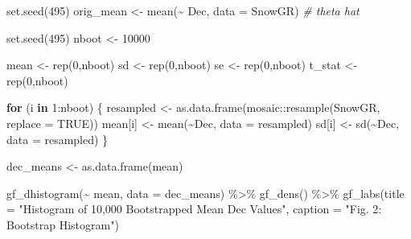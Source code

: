 \documentclass[12pt]{article}
\newenvironment{Shaded}{\begin{snugshade}}{\end{snugshade}}
\newcommand{\AttributeTok}[1]{\textcolor[rgb]{0.77,0.63,0.00}{#1}}
\newcommand{\CommentTok}[1]{\textcolor[rgb]{0.56,0.35,0.01}{\textit{#1}}}
\newcommand{\ConstantTok}[1]{\textcolor[rgb]{0.00,0.00,0.00}{#1}}
\newcommand{\ControlFlowTok}[1]{\textcolor[rgb]{0.13,0.29,0.53}{\textbf{#1}}}
\newcommand{\DecValTok}[1]{\textcolor[rgb]{0.00,0.00,0.81}{#1}}
\newcommand{\FunctionTok}[1]{\textcolor[rgb]{0.00,0.00,0.00}{#1}}
\newcommand{\NormalTok}[1]{#1}
\newcommand{\OtherTok}[1]{\textcolor[rgb]{0.56,0.35,0.01}{#1}}
\newcommand{\SpecialCharTok}[1]{\textcolor[rgb]{0.00,0.00,0.00}{#1}}
\newcommand{\StringTok}[1]{\textcolor[rgb]{0.31,0.60,0.02}{#1}}
\begin{document}
\begin{Shaded}
\begin{Highlighting}[]
\FunctionTok{set.seed}\NormalTok{(}\DecValTok{495}\NormalTok{)}
\NormalTok{orig\_mean }\OtherTok{\textless{}{-}} \FunctionTok{mean}\NormalTok{(}\SpecialCharTok{\textasciitilde{}}\NormalTok{ Dec, }\AttributeTok{data =}\NormalTok{ SnowGR) }\CommentTok{\# theta hat}

\FunctionTok{set.seed}\NormalTok{(}\DecValTok{495}\NormalTok{)}
\NormalTok{nboot }\OtherTok{\textless{}{-}} \DecValTok{10000}

\NormalTok{mean }\OtherTok{\textless{}{-}} \FunctionTok{rep}\NormalTok{(}\DecValTok{0}\NormalTok{,nboot)}
\NormalTok{sd }\OtherTok{\textless{}{-}} \FunctionTok{rep}\NormalTok{(}\DecValTok{0}\NormalTok{,nboot)}
\NormalTok{se }\OtherTok{\textless{}{-}} \FunctionTok{rep}\NormalTok{(}\DecValTok{0}\NormalTok{,nboot)}
\NormalTok{t\_stat }\OtherTok{\textless{}{-}} \FunctionTok{rep}\NormalTok{(}\DecValTok{0}\NormalTok{,nboot)}

\ControlFlowTok{for}\NormalTok{ (i }\ControlFlowTok{in} \DecValTok{1}\SpecialCharTok{:}\NormalTok{nboot) \{}
\NormalTok{  resampled }\OtherTok{\textless{}{-}} \FunctionTok{as.data.frame}\NormalTok{(mosaic}\SpecialCharTok{::}\FunctionTok{resample}\NormalTok{(SnowGR, }\AttributeTok{replace =} \ConstantTok{TRUE}\NormalTok{))}
\NormalTok{  mean[i] }\OtherTok{\textless{}{-}} \FunctionTok{mean}\NormalTok{(}\SpecialCharTok{\textasciitilde{}}\NormalTok{Dec, }\AttributeTok{data =}\NormalTok{ resampled)}
\NormalTok{  sd[i] }\OtherTok{\textless{}{-}} \FunctionTok{sd}\NormalTok{(}\SpecialCharTok{\textasciitilde{}}\NormalTok{Dec, }\AttributeTok{data =}\NormalTok{ resampled)}
\NormalTok{\}}

\NormalTok{dec\_means }\OtherTok{\textless{}{-}} \FunctionTok{as.data.frame}\NormalTok{(mean)}
\end{Highlighting}
\end{Shaded}

\begin{Shaded}
\begin{Highlighting}[]
\FunctionTok{gf\_dhistogram}\NormalTok{(}\SpecialCharTok{\textasciitilde{}}\NormalTok{ mean, }\AttributeTok{data =}\NormalTok{ dec\_means) }\SpecialCharTok{\%\textgreater{}\%}
  \FunctionTok{gf\_dens}\NormalTok{() }\SpecialCharTok{\%\textgreater{}\%}
  \FunctionTok{gf\_labs}\NormalTok{(}\AttributeTok{title =} \StringTok{"Histogram of 10,000 Bootstrapped Mean Dec Values"}\NormalTok{,}
          \AttributeTok{caption =} \StringTok{"Fig. 2: Bootstrap Histogram"}\NormalTok{)}
\end{Highlighting}
\end{Shaded}
\end{document}
